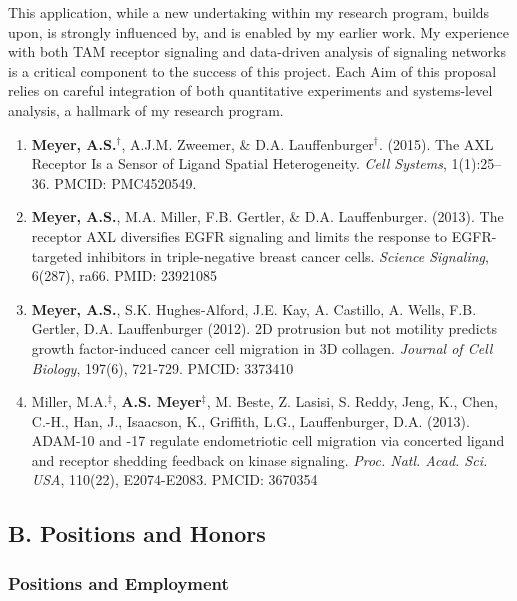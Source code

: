 \documentclass[11pt]{article}
\begin{document}
This application, while a new undertaking within my research program, builds upon, is strongly influenced by, and is enabled by my earlier work. My experience with both TAM receptor signaling and data-driven analysis of signaling networks is a critical component to the success of this project. Each Aim of this proposal relies on careful integration of both quantitative experiments and systems-level analysis, a hallmark of my research program.

\begin{enumerate}
  \item \textbf{Meyer, A.S.}$^\dag$, A.J.M. Zweemer, \& D.A. Lauffenburger$^\dag$. (2015). The AXL Receptor Is a Sensor of Ligand Spatial Heterogeneity. \emph{Cell Systems}, 1(1):25--36. PMCID: PMC4520549.
  \item \textbf{Meyer, A.S.}, M.A. Miller, F.B. Gertler, \& D.A. Lauffenburger. (2013). The receptor AXL diversifies EGFR signaling and limits the response to EGFR-targeted inhibitors in triple-negative breast cancer cells. \emph{Science Signaling}, 6(287), ra66. PMID: 23921085
  \item \textbf{Meyer, A.S.}, S.K. Hughes-Alford, J.E. Kay, A. Castillo, A. Wells, F.B. Gertler, D.A. Lauffenburger (2012). 2D protrusion but not motility predicts growth factor-induced cancer cell migration in 3D collagen. \emph{Journal of Cell Biology}, 197(6), 721-729. PMCID: 3373410
  \item Miller, M.A.$^\ddag$, \textbf{A.S. Meyer}$^\ddag$, M. Beste, Z. Lasisi, S. Reddy, Jeng, K., Chen, C.-H., Han, J., Isaacson, K., Griffith, L.G., Lauffenburger, D.A. (2013). ADAM-10 and -17 regulate endometriotic cell migration via concerted ligand and receptor shedding feedback on kinase signaling. \emph{Proc. Natl. Acad. Sci. USA}, 110(22), E2074-E2083. PMCID: 3670354
\end{enumerate}





\subsection{B. Positions and Honors}

\subsubsection{Positions and Employment}
\end{document}
